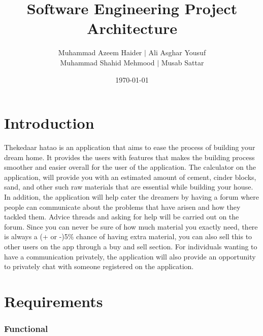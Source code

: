 \documentclass{article}
\title{Software Engineering Project Architecture}
\author{Muhammad Azeem Haider $\mid$ Ali Asghar Yousuf \\
      Muhammad Shahid Mehmood $\mid$ Musab Sattar}
\date{\today}
\begin{document}
\maketitle

\section*{Introduction}

Thekedaar hatao is an application that aims to ease the process of building
your dream home. It provides the users with features that makes the building
process smoother and easier overall for the user of the application. The
calculator on the application, will provide you with an estimated amount of
cement, cinder blocks, sand, and other such raw materials that are essential
while building your house. In addition, the application will help cater the
dreamers by having a forum where people can communicate about the problems that
have arisen and how they tackled them. Advice threads and asking for help will
be carried out on the forum. Since you can never be sure of how much material
you exactly need, there is always a (+ or -)5\% chance of having extra
material, you can also sell this to other users on the app through a buy and
sell section. For individuals wanting to have a communication privately, the
application will also provide an opportunity to privately chat with someone
registered on the application.

\section*{Requirements}

\subsubsection*{Functional}
\end{document}
